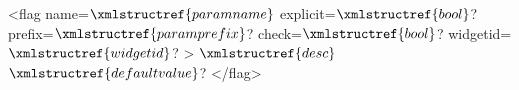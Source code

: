 <flag name=$\xmlstructref{paramname}$ explicit=$\xmlstructref{bool}$? prefix=$\xmlstructref{paramprefix}$? check=$\xmlstructref{bool}$? 
     widgetid=$\xmlstructref{widgetid}$? >
  $\xmlstructref{desc}$
  $\xmlstructref{defaultvalue}$?
</flag>
